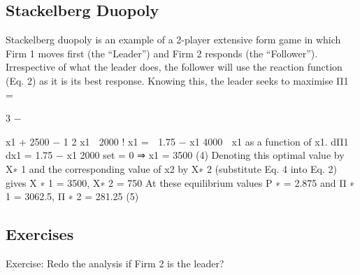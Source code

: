 \subsection{Stackelberg Duopoly}
Stackelberg duopoly is an example of a 2-player extensive form game in which Firm 1
moves first (the “Leader”) and Firm 2 responds (the “Follower”). Irrespective of what
the leader does, the follower will use the reaction function (Eq. 2) as it is its best response.
Knowing this, the leader seeks to maximise
Π1 =

3 −

x1 + 2500 −
1
2
x1

2000 !
x1 =

1.75 −
x1
4000

x1
as a function of x1.
dΠ1
dx1
= 1.75 −
x1
2000
set = 0
⇒ x1 = 3500 (4)
Denoting this optimal value by X∗
1
and the corresponding value of x2 by X∗
2
(substitute
Eq. 4 into Eq. 2) gives
X
∗
1 = 3500, X∗
2 = 750
At these equilibrium values
P
∗ = 2.875
and
Π
∗
1 = 3062.5, Π
∗
2 = 281.25 (5)

\subsection{Exercises}
Exercise: Redo the analysis if Firm 2 is the leader?
